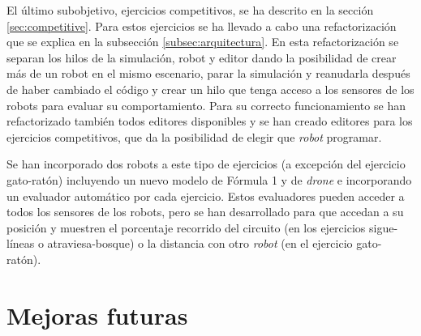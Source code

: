 El último subobjetivo, ejercicios competitivos, se ha descrito en la sección \ref{sec:competitive}. Para estos ejercicios se ha llevado a cabo una refactorización que se explica en la subsección \ref{subsec:arquitectura}. En esta refactorización se separan los hilos de la simulación, robot y editor dando la posibilidad de crear más de un robot en el mismo escenario, parar la simulación y reanudarla después de haber cambiado el código y crear un hilo que tenga acceso a los sensores de los robots para evaluar su comportamiento. Para su correcto funcionamiento se han refactorizado también todos editores disponibles y se han creado editores para los ejercicios competitivos, que da la posibilidad de elegir que \textit{robot} programar. 


Se han incorporado dos robots a este tipo de ejercicios (a excepción del ejercicio gato-ratón) incluyendo un nuevo modelo de Fórmula 1 y de \textit{drone} e incorporando un evaluador automático por cada ejercicio. Estos evaluadores pueden acceder a todos los sensores de los robots, pero se han desarrollado para que accedan a su posición y muestren el porcentaje recorrido del circuito (en los ejercicios sigue-líneas o atraviesa-bosque) o la distancia con otro \textit{robot} (en el ejercicio gato-ratón). \\


\section{Mejoras futuras}
\label{sec:mejoras_futuras}

